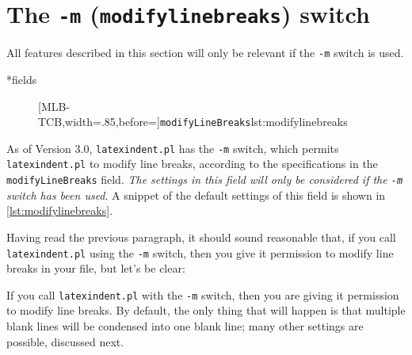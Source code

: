 \section{The \texttt{-m} (\texttt{modifylinebreaks}) switch}\label{sec:modifylinebreaks}
 All features described in this section will only be relevant if the \texttt{-m} switch
 is used.


*{fields}
	\begin{figure}
		[MLB-TCB,width=.85\linewidth,before=\centering]{\texttt{modifyLineBreaks}}{lst:modifylinebreaks}
	\end{figure}
	As of Version 3.0, \texttt{latexindent.pl} has the \texttt{-m} switch, which
	permits \texttt{latexindent.pl} to modify line breaks, according to the
	specifications in the \texttt{modifyLineBreaks} field. \emph{The settings
		in this field will only be considered if the \texttt{-m} switch has been used}.
	A snippet of the default settings of this field is shown in \cref{lst:modifylinebreaks}.

	Having read the previous paragraph, it should sound reasonable that, if you call \texttt{latexindent.pl}
	using the \texttt{-m} switch, then you give it permission to modify line breaks in your file,
	but let's be clear:

	\begin{warning}
		If you call \texttt{latexindent.pl} with the \texttt{-m} switch, then you
		are giving it permission to modify line breaks. By default, the only
		thing that will happen is that multiple blank lines will be condensed into
		one blank line; many other settings are possible, discussed next.
	\end{warning}

